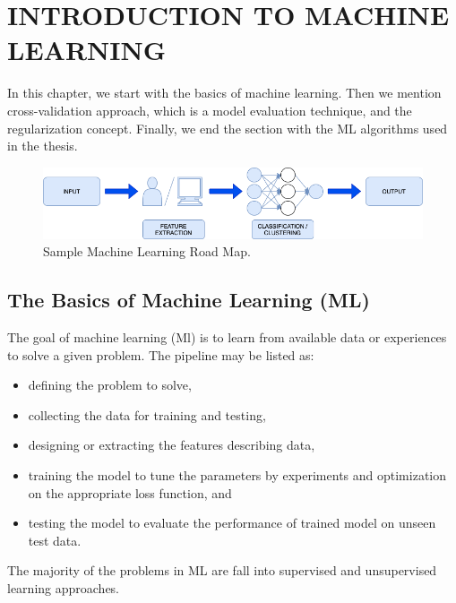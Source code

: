 \chapter{INTRODUCTION TO MACHINE LEARNING}\label{ch:CH4}

In this chapter, we start with the basics of machine learning. Then we mention cross-validation approach, which is a model evaluation technique, and the regularization concept. Finally, we end the section with the ML algorithms used in the thesis.

\begin{figure}[h]
	\centering
	\includegraphics[width=\linewidth]{fig/basic_ml.png}
	\vspace*{2mm}
	\caption{Sample Machine Learning Road Map.}
	\label{basic_ml}
\end{figure}

\section{The Basics of Machine Learning (ML)}

The goal of machine learning (Ml) is to learn from available data or experiences to solve a given problem. The pipeline may be listed as:

\begin{itemize}
    \item defining the problem to solve,
    \item collecting the data for training and testing,
    \item designing or extracting the features describing data,
    \item training the model to tune the parameters by experiments and optimization on the appropriate loss function, and
    \item testing the model to evaluate the performance of trained model on unseen test data.
\end{itemize}

The majority of the problems in ML are fall into supervised and unsupervised learning approaches.

